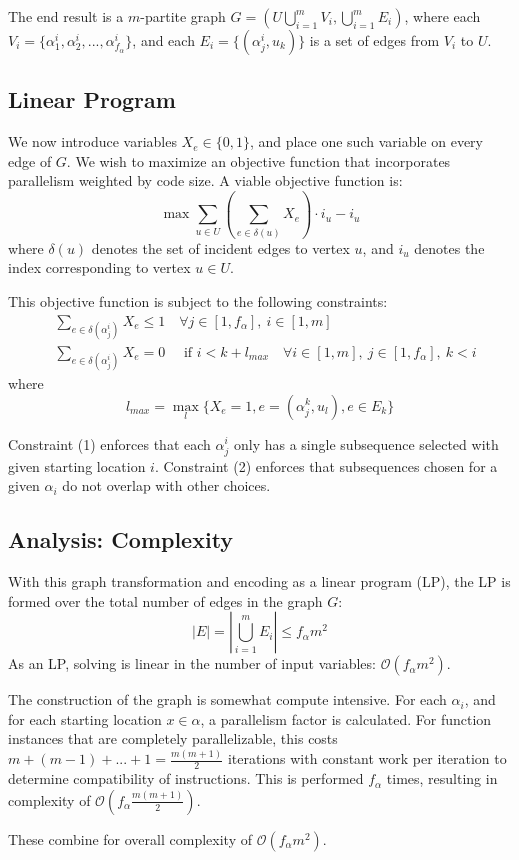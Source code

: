 \documentclass[12pt,twoside]{article}
\begin{document}
The end result is a $m$-partite graph $G = (U \bigcup\limits_{i=1}^{m} V_i, \bigcup_{i=1}^{m} E_i)$, where each $V_i = \{\alpha_1^i, \alpha_2^i, ... , \alpha_{f_{\alpha}}^i\}$, and each $E_i = \{(\alpha_j^i, u_k)\}$ is a set of edges from $V_i$ to $U$.

\subsection{Linear Program}
We now introduce variables $X_e \in \{0,1\}$, and place one such variable on every edge of $G$. We wish to maximize an objective function that incorporates parallelism weighted by code size. A viable objective function is:
	\begin{equation}
		\max \sum_{u \in U}\left(\sum_{e \in \delta (u)} X_e\right) \cdot i_u - i_u
	\end{equation}
	where $\delta(u)$ denotes the set of incident edges to vertex $u$, and $i_u$ denotes the index corresponding to vertex $u \in U$.

	This objective function is subject to the following constraints:
	\begin{align}
		&\sum_{e \in \delta(\alpha_j^i)} X_e \leq 1 \quad \forall j \in [1, f_{\alpha}],\ i \in [1, m] \tag{1} \\
		&\sum_{e \in \delta(\alpha_j^i)} X_e = 0 \quad \text{ if } i < k + l_{max} \quad \forall i \in [1,m],\ j \in [1,f_{\alpha}],\ k<i \tag{2}
	\end{align}
	where \begin{equation}
		l_{max} = \max_l \{X_e = 1, e = ( \alpha_j^k, u_l), e \in E_k\}
	\end{equation}

	Constraint (1) enforces that each $\alpha_j^i$ only has a single subsequence selected with given starting location $i$. Constraint (2) enforces that subsequences chosen for a given $\alpha_i$ do not overlap with other choices.   

\subsection{Analysis: Complexity}
With this graph transformation and encoding as a linear program (LP), the LP is formed over the total number of edges in the graph $G$:
	\begin{equation}
		|E| = |\bigcup_{i=1}^m E_i| \leq f_{\alpha}m^2 
	\end{equation}
	As an LP, solving is linear in the number of input variables: $\mathcal{O}(f_{\alpha}m^2)$. 

The construction of the graph is somewhat compute intensive. For each $\alpha_i$, and for each starting location $x \in \alpha$, a parallelism factor is calculated. For function instances that are completely parallelizable, this costs $m + (m-1) + ... + 1 = \frac{m(m+1)}{2}$ iterations with constant work per iteration to determine compatibility of instructions. This is performed $f_{\alpha}$ times, resulting in complexity of $\mathcal{O}(f_{\alpha}\frac{m(m+1)}{2})$. 

These combine for overall complexity of $\mathcal{O}(f_{\alpha}m^2)$.
\end{document}
